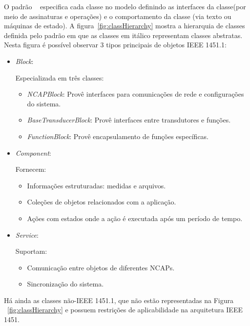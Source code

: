 O padrão ~\cite{ieee1451standard} especifica cada classe no modelo definindo as interfaces da classe(por meio de assinaturas e operações) e o comportamento da classe (via texto ou máquinas de estado). A figura~\ref{fig:classHierarchy} mostra a hierarquia de classes definida pelo padrão em que as classes em itálico representam classes abstratas. Nesta figura é possível observar 3 tipos principais de objetos IEEE 1451.1:

\begin{itemize}
	\item\emph{Block}:

	Especializada em três classes:
		\begin{itemize}
			\item\emph{NCAPBlock}:
				Provê interfaces para comunicações de rede e configurações do sistema.
			\item\emph{BaseTransducerBlock}:
				Provê interfaces entre transdutores e funções.
			\item\emph{FunctionBlock}:
				Provê encapsulamento de funções específicas.
		\end{itemize}
	
	\item\emph{Component}:
	
		Fornecem:
		\begin{itemize}
			\item Informações estruturadas: medidas e arquivos.
			\item Coleções de objetos relacionados com a aplicação.
			\item Ações com estados onde a ação é executada após um período de tempo.
		\end{itemize}
	\item\emph{Service}:
	
		Suportam:
		\begin{itemize}
			\item Comunicação entre objetos de diferentes NCAPs.
			\item Sincronização do sistema.
		\end{itemize}
\end{itemize}

Há ainda as classes não-IEEE 1451.1, que não estão representadas na Figura ~\ref{fig:classHierarchy} e possuem restrições de aplicabilidade na arquitetura IEEE 1451.


